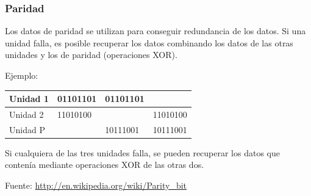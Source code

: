 \documentclass[aspectratio=169]{beamer}
\begin{document}
\begin{frame}
  \frametitle{Paridad}
  Los datos de paridad se utilizan para conseguir redundancia de
  los datos. Si una unidad falla, es posible recuperar los datos
  combinando los datos de las otras unidades y los de paridad
  (operaciones XOR).\par
  
  Ejemplo:\par

  \begin{center}
    \begin{tabular}[center]{|l|l|l|l|}
      \hline
      Unidad 1&01101101&01101101&\\
      \hline
      Unidad 2&11010100&&11010100\\
      \hline
      Unidad P&&10111001&10111001\\
      \hline
    \end{tabular}
  \end{center}

  Si cualquiera de las tres unidades falla, se pueden recuperar los
  datos que contenía mediante operaciones XOR de las otras dos.\par
  \begin{flushright}
    \tiny{Fuente: \url{http://en.wikipedia.org/wiki/Parity_bit}}
  \end{flushright}
\end{frame}

\end{document}
